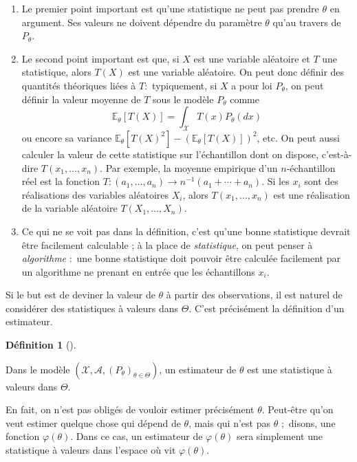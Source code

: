 \documentclass[
  10,
  letterpaper,
  DIV=11,
  numbers=noendperiod]{scrreport}
\theoremstyle{plain}
\theoremstyle{definition}
\theoremstyle{plain}
\theoremstyle{definition}
\newtheorem{definition}{Définition}[chapter]
\theoremstyle{definition}
\theoremstyle{plain}
\theoremstyle{remark}
\begin{document}
\begin{enumerate}
\def\labelenumi{\arabic{enumi})}
\item
  Le premier point important est qu'une statistique ne peut pas prendre
  \(\theta\) en argument. Ses valeurs ne doivent dépendre du paramètre
  \(\theta\) qu'au travers de \(P_\theta\).
\item
  Le second point important est que, si \(X\) est une variable aléatoire
  et \(T\) une statistique, alors \(T(X)\) est une variable aléatoire.
  On peut donc définir des quantités théoriques liées à
  \(T\):~typiquement, si \(X\) a pour loi \(P_\theta\), on peut définir
  la valeur moyenne de \(T\) sous le modèle \(P_\theta\) comme
  \[\mathbb{E}_\theta[T(X)] = \int_{\mathcal{X}} T(x) P_\theta(dx)\] ou
  encore sa variance
  \(\mathbb{E}_\theta[T(X)^2] - (\mathbb{E}_\theta[T(X)])^2\), etc. On
  peut aussi calculer la valeur de cette statistique sur l'échantillon
  dont on dispose, c'est-à-dire \(T(x_1, \dotsc, x_n)\). Par exemple, la
  moyenne empirique d'un \(n\)-échantillon réel est la fonction
  \(T : (a_1, \dots, a_n) \to n^{-1}(a_1+\dotsb + a_n)\). Si les \(x_i\)
  sont des réalisations des variables aléatoires \(X_i\), alors
  \(T(x_1, \dotsc, x_n)\) est une réalisation de la variable aléatoire
  \(T(X_1, \dotsc, X_n)\).
\item
  Ce qui ne se voit pas dans la définition, c'est qu'une bonne
  statistique devrait être facilement calculable ; à la place de
  \emph{statistique}, on peut penser à \emph{algorithme} :~une bonne
  statistique doit pouvoir être calculée facilement par un algorithme ne
  prenant en entrée que les échantillons \(x_i\).
\end{enumerate}

Si le but est de deviner la valeur de \(\theta\) à partir des
observations, il est naturel de considérer des statistiques à valeurs
dans \(\Theta\). C'est précisément la définition d'un estimateur.

\begin{definition}[]\protect\hypertarget{def-estimateur}{}\label{def-estimateur}

Dans le modèle
\((\mathcal{X},\mathcal{A}, (P_\theta)_{\theta \in \Theta})\), un
estimateur de \(\theta\) est une statistique à valeurs dans \(\Theta\).

\end{definition}

En fait, on n'est pas obligés de vouloir estimer précisément \(\theta\).
Peut-être qu'on veut estimer quelque chose qui dépend de \(\theta\),
mais qui n'est pas \(\theta\) ;~disons, une fonction
\(\varphi(\theta)\). Dans ce cas, un estimateur de \(\varphi(\theta)\)
sera simplement une statistique à valeurs dans l'espace où vit
\(\varphi(\theta)\).
\end{document}
